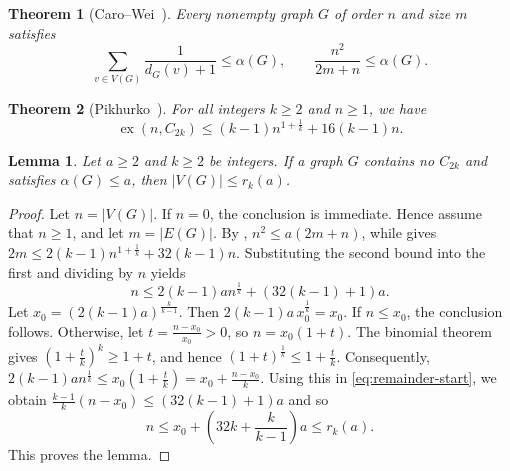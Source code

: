 \documentclass[11pt,a4paper]{article}
\newtheorem{theorem}{Theorem}[section]
\newtheorem{lemma}[lemma]{Lemma}
\theoremstyle{remark}
\numberwithin{equation}{section}
\DeclareMathOperator{\ex}{ex}
\begin{document}
	\begin{theorem}[Caro--Wei~\cite{Caro,Wei}]\label{thm:carowei}
		Every nonempty graph $G$ of order $n$ and size $m$ satisfies
		\[
		\sum_{v\in V(G)}\frac{1}{d_G(v)+1}\le\alpha(G),
		\qquad \frac{n^2}{2m+n}\le\alpha(G).
		\]
	\end{theorem}
	\begin{theorem}[{Pikhurko~\cite{Pikhurko}}]\label{thm:pikhurko}
		For all integers $k\ge2$ and $n\ge1$, we have
		\[
		\ex(n,C_{2k})\le(k-1)n^{1+\frac{1}{k}}+16(k-1)n.
		\]
	\end{theorem}
	\begin{lemma}\label{lem:remainder}
		Let $a\ge2$ and $k\ge2$ be integers.
		If a graph $G$ contains no $C_{2k}$ and satisfies $\alpha(G)\le a$, then $|V(G)|\le r_k(a)$.
	\end{lemma}
	\begin{proof}
		Let $n=|V(G)|$. If $n=0$, the conclusion is immediate.
		Hence assume that $n\ge1$, and let $m=|E(G)|$.
		By , $n^2\le a(2m+n)$, while  gives
		$2m\le2(k-1)n^{1+\frac{1}{k}}+32(k-1)n$.
		Substituting the second bound into the first and dividing by $n$ yields
		\begin{equation}\label{eq:remainder-start}
			n\le 2(k-1)a n^{\frac{1}{k}}+(32(k-1)+1)a.
		\end{equation}
		Let $x_0=(2(k-1)a)^{\frac{k}{k-1}}$. Then $2(k-1)a\,x_0^{\frac{1}{k}}=x_0$.
		If $n\le x_0$, the conclusion follows. Otherwise, let $t =\frac{n-x_0}{x_0}>0$, so $n=x_0(1+t)$.
		The binomial theorem gives $(1+\frac{t }{k})^k\ge1+t $, and hence $(1+t )^{\frac{1}{k}}\le1+\frac{t }{k}$.
		Consequently, $2(k-1)a n^{\frac{1}{k}}\le x_0(1+\frac{t }{k})=x_0+\frac{n-x_0}{k}$.
		Using this in \eqref{eq:remainder-start}, we obtain
		$\frac{k-1}{k}(n-x_0)\le (32(k-1)+1)a$ and so
		\[
		n\le x_0+\left(32k+\frac{k}{k-1}\right)a\le r_k(a).
		\]
		This proves the lemma.
	\end{proof}
	
\end{document}

